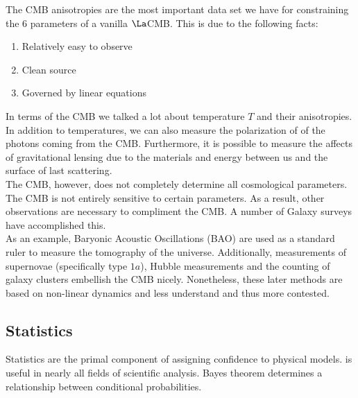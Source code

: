\documentclass{article}
\begin{document}
The CMB anisotropies are the most important data set we have for constraining the $6$ parameters of a vanilla $\La$CMB. This is due to the following facts:
\begin{enumerate}
    \item Relatively easy to observe
    \item Clean source
    \item Governed by linear equations
\end{enumerate}
In terms of the CMB we talked a lot about temperature $T$ and their anisotropies. In addition to temperatures, we can also measure the polarization of of the photons coming from the CMB. Furthermore, it is possible to measure the affects of gravitational lensing due to the materials and energy between us and the surface of last scattering.\\

The CMB, however, does not completely determine all cosmological parameters. The CMB is not entirely sensitive to certain parameters. As a result, other observations are necessary to compliment the CMB. A number of Galaxy surveys have accomplished this. \\

As an example, Baryonic Acoustic Oscillations (BAO) are used as a standard ruler to measure the tomography of the universe. Additionally, measurements of supernovae (specifically type $1a$), Hubble measurements and the counting of galaxy clusters embellish the CMB nicely. Nonetheless, these later methods are based on non-linear dynamics and less understand and thus more contested.

\subsection{Statistics}

Statistics are the primal component of assigning confidence to physical models.  is useful in nearly all fields of scientific analysis. Bayes theorem determines a relationship between conditional probabilities.

\begin{center}
\end{center}
\end{document}
